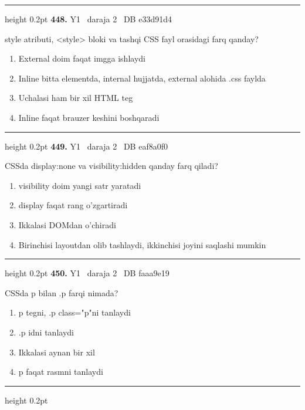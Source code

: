 \documentclass[10pt,a4paper,oneside]{article}
\begin{document}
\vspace{2mm}\hrule height 0.2pt \vspace{4mm}
\hypertarget{q448}{\textbf{\color{ink}448.}}  {\color{muted}\scriptsize Y1 \textbullet\ daraja 2 \textbullet\ DB e33d91d4}
\par
style atributi, \textless{}style\textgreater{} bloki va tashqi CSS fayl orasidagi farq qanday?
\begin{enumerate}[label=\Alph*),leftmargin=9mm]
\item External doim faqat imgga ishlaydi
\item Inline bitta elementda, internal hujjatda, external alohida .css faylda
\item Uchalasi ham bir xil HTML teg
\item Inline faqat brauzer keshini boshqaradi
\end{enumerate}
\vspace{2mm}\hrule height 0.2pt \vspace{4mm}
\hypertarget{q449}{\textbf{\color{ink}449.}}  {\color{muted}\scriptsize Y1 \textbullet\ daraja 2 \textbullet\ DB eaf8a0f0}
\par
CSSda display:none va visibility:hidden qanday farq qiladi?
\begin{enumerate}[label=\Alph*),leftmargin=9mm]
\item visibility doim yangi satr yaratadi
\item display faqat rang o'zgartiradi
\item Ikkalasi DOMdan o'chiradi
\item Birinchisi layoutdan olib tashlaydi, ikkinchisi joyini saqlashi mumkin
\end{enumerate}
\vspace{2mm}\hrule height 0.2pt \vspace{4mm}
\hypertarget{q450}{\textbf{\color{ink}450.}}  {\color{muted}\scriptsize Y1 \textbullet\ daraja 2 \textbullet\ DB faaa9e19}
\par
CSSda p bilan .p farqi nimada?
\begin{enumerate}[label=\Alph*),leftmargin=9mm]
\item p tegni, .p class="p"ni tanlaydi
\item .p idni tanlaydi
\item Ikkalasi aynan bir xil
\item p faqat rasmni tanlaydi
\end{enumerate}
\vspace{2mm}\hrule height 0.2pt \vspace{4mm}
\end{document}
